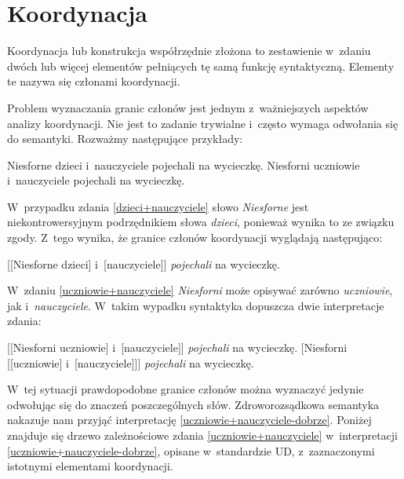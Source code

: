 \section{Koordynacja}

Koordynacja lub konstrukcja współrzędnie złożona to zestawienie w~zdaniu dwóch lub więcej elementów pełniących tę samą funkcję syntaktyczną. Elementy te nazywa się członami koordynacji.

Problem wyznaczania granic członów jest jednym z~ważniejszych aspektów analizy koordynacji. Nie jest to zadanie trywialne i~często wymaga odwołania się do semantyki. Rozważmy następujące przykłady:

\begin{exe}
\ex \label{dzieci+nauczyciele} Niesforne dzieci i~nauczyciele pojechali na wycieczkę.
\ex \label{uczniowie+nauczyciele} Niesforni uczniowie i~nauczyciele pojechali na wycieczkę.
\end{exe}

W~przypadku zdania \eqref{dzieci+nauczyciele} słowo \emph{Niesforne} jest niekontrowersyjnym podrzędnikiem słowa \emph{dzieci}, ponieważ wynika to ze związku zgody.  Z~tego wynika, że granice członów koordynacji wyglądają następująco:

\begin{exe}
\ex \label{dzieci+nauczyciele-nawiasy}
{[[Niesforne dzieci] i~[nauczyciele]] \emph{pojechali} na wycieczkę.}
\end{exe}

W~zdaniu \eqref{uczniowie+nauczyciele} \emph{Niesforni} może opisywać zarówno \emph{uczniowie}, jak i~\emph{nauczyciele}. W~takim wypadku syntaktyka dopuszcza dwie interpretacje zdania:

\begin{exe}
\ex \label{uczniowie+nauczyciele-dobrze}
{[[Niesforni uczniowie] i~[nauczyciele]] \emph{pojechali} na wycieczkę.}
\ex \label{uczniowie+nauczyciele-źle}
{[Niesforni [[uczniowie] i~[nauczyciele]]] \emph{pojechali} na wycieczkę.}
\end{exe}

W~tej sytuacji prawdopodobne granice członów można wyznaczyć jedynie odwołując się do znaczeń poszczególnych słów. Zdroworozsądkowa semantyka nakazuje nam przyjąć interpretację \eqref{uczniowie+nauczyciele-dobrze}. Poniżej znajduje się drzewo zależnościowe zdania \eqref{uczniowie+nauczyciele} w~interpretacji \eqref{uczniowie+nauczyciele-dobrze}, opisane w~standardzie UD, z~zaznaczonymi istotnymi elementami koordynacji.

